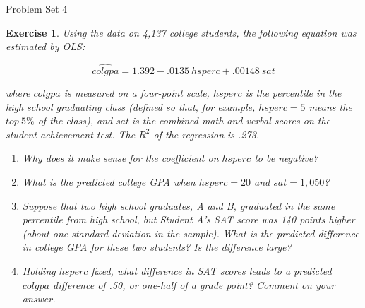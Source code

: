 \documentclass{article}
\newtheorem{exercise}[theorem]{Exercise}
\begin{document}
\begin{center} 
{\Large Problem Set 4}
\end{center}


\begin{exercise} %
Using the data on 4,137 college students, the following equation was estimated by OLS:

\begin{equation*}
    \widehat{colgpa}=1.392-.0135~hsperc+.00148~sat
\end{equation*}

where $colgpa$ is measured on a four-point scale, $hsperc$ is the percentile in the high school graduating class (defined so that, for example, $hsperc= 5$ means the $top~5\%$ of the class), and sat is the combined math and verbal scores on the student achievement test.  The $R^2$ of the regression is .273.

\begin{enumerate}[label=(\alph*)]
    \item Why does it make sense for the coefficient on $hsperc$ to be negative?
    \item What is the predicted college GPA when $hsperc=20$ and $sat = 1,050$?
    \item Suppose that two high school graduates, A and B, graduated in the same percentile from high school, but Student A’s SAT score was 140 points higher (about one standard deviation in the sample). What is the predicted difference in college GPA for these two students? Is the difference large?
    \item Holding $hsperc$ fixed, what difference in SAT scores leads to a predicted $colgpa$ difference of .50, or one-half of a grade point? Comment on your answer.
\end{enumerate}
\end{exercise}
\end{document}

